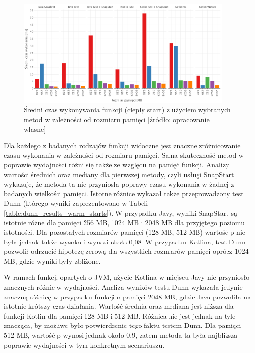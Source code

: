 \begin{figure}[h]
    \centering
    \includegraphics[width=0.95\textwidth]{charts/results/avg-warm-start.png}
    \caption{Średni czas wykonywania funkcji (ciepły start) z użyciem wybranych metod w zależności od rozmiaru pamięci [źródło: opracowanie własne]}
    \label{fig:avg_warm_start}
\end{figure}

Dla każdego z badanych rodzajów funkcji widoczne jest znaczne zróżnicowanie czasu wykonania w zależności od rozmiaru pamięci.
Sama skuteczność metod w poprawie wydajności różni się także ze względu na pamięć funkcji.
Analizy wartości średnich oraz mediany dla pierwszej metody, czyli usługi SnapStart wykazuje, że metoda ta nie przyniosła poprawy czasu wykonania w żadnej z badanych wielkości pamięci.
Istotne różnice wykazał także przeprowadzony test Dunn (którego wyniki zaprezentowano w Tabeli \ref{table:dunn_results_warm_starts}).
W przypadku Javy, wyniki SnapStart są istotnie różne dla pamięci 256 MB, 1024 MB i 2048 MB dla przyjętego poziomu istotności.
Dla pozostałych rozmiarów pamięci (128 MB, 512 MB) wartość p nie była jednak także wysoka i wynosi około 0,08.
W przypadku Kotlina, test Dunn pozwolił odrzucić hipotezę zerową dla wszystkich rozmiarów pamięci oprócz 1024 MB, gdzie wyniki były zbliżone. 

W ramach funkcji opartych o JVM, użycie Kotlina w miejscu Javy nie przyniosło znacznych różnic w wydajności.
Analiza wyników testu Dunn wykazała jedynie znaczną różnicę w przypadku funkcji o pamięci 2048 MB, gdzie Java pozwoliła na istotnie krótszy czas działania.
Wartość średnia oraz mediana jest niższa dla funkcji Kotlin dla pamięci 128 MB i 512 MB.
Różnica nie jest jednak na tyle znacząca, by możliwe było potwierdzenie tego faktu testem Dunn.
Dla pamięci 512 MB, wartość p wynosi jednak około 0,9, zatem metoda ta była najbliższa poprawie wydajności w tym konkretnym scenariuszu. 

